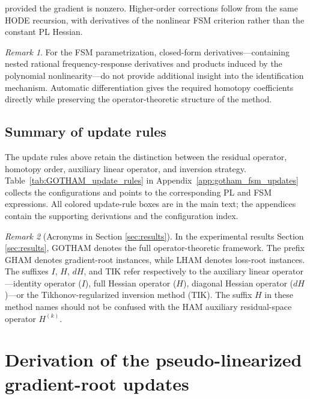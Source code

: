 \documentclass[11pt]{article}
\theoremstyle{remark}
\newtheorem{remark}{Remark}[section]
\begin{document}
provided the gradient is nonzero. Higher-order corrections follow
from the same HODE recursion, with derivatives of the nonlinear
FSM criterion rather than the constant PL Hessian.
\begin{remark}
For the FSM parametrization, closed-form derivatives---containing nested rational frequency-response derivatives and products induced by the polynomial nonlinearity---do not provide additional insight into the identification mechanism. Automatic differentiation gives the required homotopy coefficients directly while preserving the operator-theoretic structure of the method.
\end{remark}
\subsection{Summary of update rules}
\label{subsec:GOTHAM_update_summary}

The update rules above retain the distinction between the residual
operator, homotopy order, auxiliary linear operator, and inversion
strategy. Table~\ref{tab:GOTHAM_update_rules} in
Appendix~\ref{app:gotham_fsm_updates} collects the configurations and
points to the corresponding PL and FSM expressions. All colored
update-rule boxes are in the main text; the appendices contain the
supporting derivations and the configuration index.
\begin{remark}[Acronyms in Section \ref{sec:results}]
In the experimental results Section \ref{sec:results}, GOTHAM denotes the full operator-theoretic framework. The prefix GHAM denotes gradient-root instances, while LHAM denotes loss-root instances. The suffixes $I$, $H$, $dH$, and TIK refer respectively to the auxiliary linear operator---identity operator ($I$), full Hessian operator ($H$), diagonal Hessian operator ($dH$)---or the Tikhonov-regularized inversion method (TIK). The suffix $H$ in these method names should not be confused with the HAM auxiliary residual-space operator $H^{(k)}$.
\end{remark}\clearpage
\appendix
\setcounter{section}{7}
\setcounter{equation}{0}
\renewcommand{\theequation}{\thesection.\arabic{equation}}
\makeatletter{}\makeatother


\section{Derivation of the pseudo-linearized gradient-root updates}
\label{app:gotham_pl_updates}
\end{document}
